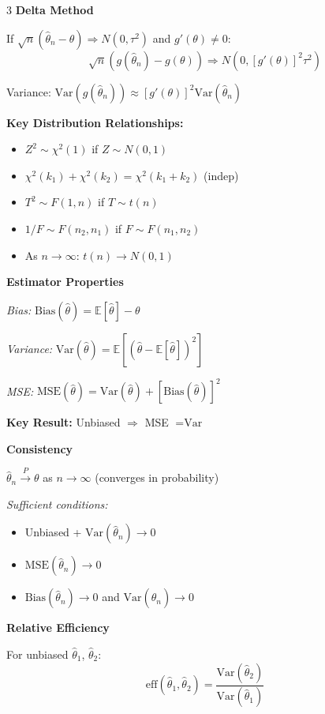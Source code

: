 \documentclass[10pt,letterpaper]{article}
\newcommand{\Var}{\text{Var}}
\newcommand{\E}{\mathbb{E}}
\begin{document}
\begin{multicols}{3}
\textbf{Delta Method}

If $\sqrt{n}(\hat{\theta}_n - \theta) \Rightarrow N(0, \tau^2)$ and $g'(\theta) \neq 0$:
$$\sqrt{n}(g(\hat{\theta}_n) - g(\theta)) \Rightarrow N(0, [g'(\theta)]^2 \tau^2)$$

Variance: $\Var(g(\hat{\theta}_n)) \approx [g'(\theta)]^2 \Var(\hat{\theta}_n)$

\textbf{Key Distribution Relationships:}
\begin{itemize}
\item $Z^2 \sim \chi^2(1)$ if $Z \sim N(0,1)$
\item $\chi^2(k_1) + \chi^2(k_2) = \chi^2(k_1+k_2)$ (indep)
\item $T^2 \sim F(1,n)$ if $T \sim t(n)$
\item $1/F \sim F(n_2, n_1)$ if $F \sim F(n_1, n_2)$
\item As $n \to \infty$: $t(n) \to N(0,1)$
\end{itemize}

\vspace{2mm}
\vspace{0.5mm}

\textbf{Estimator Properties}

\textit{Bias:} $\text{Bias}(\hat{\theta}) = \E[\hat{\theta}] - \theta$

\textit{Variance:} $\Var(\hat{\theta}) = \E[(\hat{\theta} - \E[\hat{\theta}])^2]$

\textit{MSE:} $\text{MSE}(\hat{\theta}) = \Var(\hat{\theta}) + [\text{Bias}(\hat{\theta})]^2$

\textbf{Key Result:} Unbiased $\Rightarrow$ MSE $= \Var$

\textbf{Consistency}

$\hat{\theta}_n \xrightarrow{P} \theta$ as $n \to \infty$ (converges in probability)

\textit{Sufficient conditions:}
\begin{itemize}
\item Unbiased + $\Var(\hat{\theta}_n) \to 0$
\item $\text{MSE}(\hat{\theta}_n) \to 0$
\item $\text{Bias}(\hat{\theta}_n) \to 0$ and $\Var(\hat{\theta}_n) \to 0$
\end{itemize}

\textbf{Relative Efficiency}

For unbiased $\hat{\theta}_1$, $\hat{\theta}_2$:
$$\text{eff}(\hat{\theta}_1, \hat{\theta}_2) = \frac{\Var(\hat{\theta}_2)}{\Var(\hat{\theta}_1)}$$


\end{multicols}
\end{document}
